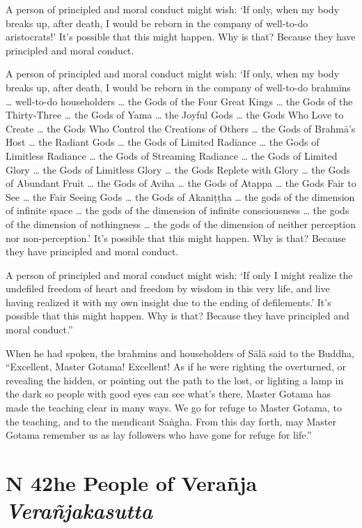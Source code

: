 \documentclass[12pt,openany]{book}%
\newcommand*{\suttatitleacronym}[1]{\smaller[2]{#1}\vspace*{.3em}}
\newcommand*{\suttatitletranslation}[1]{\linebreak{#1}}
\newcommand*{\suttatitleroot}[1]{\linebreak\smaller[2]\itshape{#1}}
\newcommand*{\tocacronym}[1]{\hspace*{-3.3em}{#1}\quad}
\newcommand*{\toctranslation}[1]{#1}
\newcommand*{\tocroot}[1]{(\textit{#1})}
\begin{document}
A person of principled and moral conduct might wish: ‘If only, when my body breaks up, after death, I would be reborn in the company of well-to-do aristocrats!’ It’s possible that this might happen. Why is that? Because they have principled and moral conduct. 

A person of principled and moral conduct might wish: ‘If only, when my body breaks up, after death, I would be reborn in the company of well-to-do brahmins … well-to-do householders … the Gods of the Four Great Kings … the Gods of the Thirty-Three … the Gods of Yama … the Joyful Gods … the Gods Who Love to Create … the Gods Who Control the Creations of Others … the Gods of \textsanskrit{Brahmā}’s Host … the Radiant Gods … the Gods of Limited Radiance … the Gods of Limitless Radiance … the Gods of Streaming Radiance … the Gods of Limited Glory … the Gods of Limitless Glory … the Gods Replete with Glory … the Gods of Abundant Fruit … the Gods of Aviha … the Gods of Atappa … the Gods Fair to See … the Fair Seeing Gods … the Gods of \textsanskrit{Akaniṭṭha} … the gods of the dimension of infinite space … the gods of the dimension of infinite consciousness … the gods of the dimension of nothingness … the gods of the dimension of neither perception nor non-perception.’ It’s possible that this might happen. Why is that? Because they have principled and moral conduct. 

A person of principled and moral conduct might wish: ‘If only I might realize the undefiled freedom of heart and freedom by wisdom in this very life, and live having realized it with my own insight due to the ending of defilements.’ It’s possible that this might happen. Why is that? Because they have principled and moral conduct.” 

When he had spoken, the brahmins and householders of \textsanskrit{Sālā} said to the Buddha, “Excellent, Master Gotama! Excellent! As if he were righting the overturned, or revealing the hidden, or pointing out the path to the lost, or lighting a lamp in the dark so people with good eyes can see what’s there, Master Gotama has made the teaching clear in many ways. We go for refuge to Master Gotama, to the teaching, and to the mendicant \textsanskrit{Saṅgha}. From this day forth, may Master Gotama remember us as lay followers who have gone for refuge for life.” 

%
\section*{{\suttatitleacronym MN 42}{\suttatitletranslation The People of Verañja }{\suttatitleroot Verañjakasutta}}
\addcontentsline{toc}{section}{\tocacronym{MN 42} \toctranslation{The People of Verañja } \tocroot{Verañjakasutta}}
\end{document}

